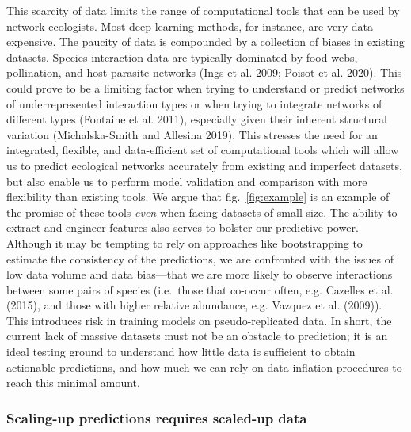 \documentclass[10pt,oneside]{article}
\begin{document}
This scarcity of data limits the range of computational tools that can
be used by network ecologists. Most deep learning methods, for instance,
are very data expensive. The paucity of data is compounded by a
collection of biases in existing datasets. Species interaction data are
typically dominated by food webs, pollination, and host-parasite
networks (Ings et al. 2009; Poisot et al. 2020). This could prove to be
a limiting factor when trying to understand or predict networks of
underrepresented interaction types or when trying to integrate networks
of different types (Fontaine et al. 2011), especially given their
inherent structural variation (Michalska-Smith and Allesina 2019). This
stresses the need for an integrated, flexible, and data-efficient set of
computational tools which will allow us to predict ecological networks
accurately from existing and imperfect datasets, but also enable us to
perform model validation and comparison with more flexibility than
existing tools. We argue that fig.~\ref{fig:example} is an example of
the promise of these tools \emph{even} when facing datasets of small
size. The ability to extract and engineer features also serves to
bolster our predictive power. Although it may be tempting to rely on
approaches like bootstrapping to estimate the consistency of the
predictions, we are confronted with the issues of low data volume and
data bias---that we are more likely to observe interactions between some
pairs of species (i.e.~those that co-occur often, e.g. Cazelles et al.
(2015), and those with higher relative abundance, e.g. Vazquez et al.
(2009)). This introduces risk in training models on pseudo-replicated
data. In short, the current lack of massive datasets must not be an
obstacle to prediction; it is an ideal testing ground to understand how
little data is sufficient to obtain actionable predictions, and how much
we can rely on data inflation procedures to reach this minimal amount.

\hypertarget{scaling-up-predictions-requires-scaled-up-data}{%
\subsubsection{Scaling-up predictions requires scaled-up
data}\label{scaling-up-predictions-requires-scaled-up-data}}
\end{document}
